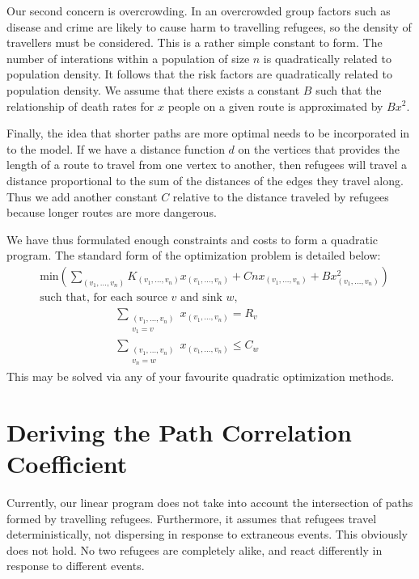 \documentclass{article}
\begin{document}
Our second concern is overcrowding. In an overcrowded group factors such as disease and crime are likely to cause harm to travelling refugees, so the density of travellers must be considered. This is a rather simple constant to form. The number of interations within a population of size $n$ is quadratically related to population density. It follows that the risk factors are quadratically related to population density. We assume that there exists a constant $B$ such that the relationship of death rates for $x$ people on a given route is approximated by $Bx^2$. 

Finally, the idea that shorter paths are more optimal needs to be incorporated in to the model. If we have a distance function $d$ on the vertices that provides the length of a route to travel from one vertex to another, then refugees will travel a distance proportional to the sum of the distances of the edges they travel along. Thus we add another constant $C$ relative to the distance traveled by refugees because longer routes are more dangerous.

We have thus formulated enough constraints and costs to form a quadratic program.  The standard form of the optimization problem is detailed below:
%
\begin{align*}
    &\text{min} \left( \sum_{(v_1, \dots, v_n)} K_{(v_1, \dots, v_n)} x_{(v_1, \dots, v_n)} + Cn x_{(v_1, \dots, v_n)} + B x_{(v_1, \dots, v_n)}^2 \right)\\
    &\text{such that, for each source $v$ and sink $w$,}\\
    &\ \ \ \ \ \ \ \ \ \ \ \ \ \ \ \ \ \ \ \ \ \ \ \ \ \ \ \ \ \ \sum_{\substack{(v_1, \dots, v_n) \\ v_1 = v}} x_{(v_1, \dots, v_n)} = R_v\\
    &\ \ \ \ \ \ \ \ \ \ \ \ \ \ \ \ \ \ \ \ \ \ \ \ \ \ \ \ \ \ \sum_{\substack{(v_1, \dots, v_n) \\ v_n = w}} x_{(v_1, \dots, v_n)} \leq C_w
\end{align*}
%
This may be solved via any of your favourite quadratic optimization methods.

\section{Deriving the Path Correlation Coefficient}

Currently, our linear program does not take into account the intersection of paths formed by travelling refugees. Furthermore, it assumes that refugees travel deterministically, not dispersing in response to extraneous events. This obviously does not hold. No two refugees are completely alike, and react differently in response to different events.
\end{document}
